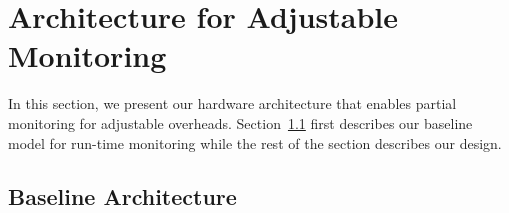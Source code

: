 \section{Architecture for Adjustable Monitoring}
\label{sec:dropping}

In this section, we present our hardware architecture that enables partial
monitoring for adjustable overheads. Section~\ref{sec:dropping.baseline} first
describes our baseline model for run-time monitoring while the rest of the
section describes our design.

\subsection{Baseline Architecture}
\label{sec:dropping.baseline}

